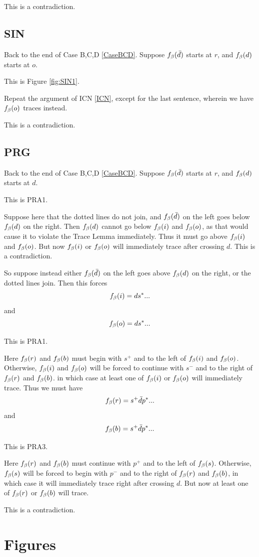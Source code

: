 This is a contradiction.

\subsection{SIN} \label{SIN}
Back to the end of Case B,C,D \ref{CaseBCD}. Suppose $f_\beta(\bar{d})$ starts at $r$, and $f_\beta(d)$ starts at $o$.

This is Figure \ref{fig:SIN1}.

Repeat the argument of ICN \ref{ICN}, except for the last sentence, wherein we have $f_\beta(o)$ traces instead.

This is a contradiction.

\subsection{PRG}
Back to the end of Case B,C,D \ref{CaseBCD}. Suppose $f_\beta(\bar{d})$ starts at $r$, and $f_\beta(d)$ starts at $d$.

This is PRA1.

Suppose here that the dotted lines do not join, and $f_\beta(\bar{d})$ on the left goes below $f_\beta(d)$ on the right. Then $f_\beta(d)$ cannot go below $f_\beta(i)$ and $f_\beta(o)$, as that would cause it to violate the Trace Lemma immediately. Thus it must go above $f_\beta(i)$ and $f_\beta(o)$. But now $f_\beta(i)$ or $f_\beta(o)$ will immediately trace after crossing $d$. This is a contradiction. 

So suppose instead either $f_\beta(\bar{d})$ on the left goes above $f_\beta(d)$ on the right, or the dotted lines join. Then this forces 
\[
f_\beta(i) = d s^*...
\]
and
\[
f_\beta(o) = d s^*...
\]

This is PRA1.

Here $f_\beta(r)$ and $f_\beta(b)$ must begin with $s^+$ and to the left of $f_\beta(i)$ and $f_\beta(o)$. Otherwise, $f_\beta(i)$ and $f_\beta(o)$ will be forced to continue with $s^-$ and to the right of $f_\beta(r)$ and $f_\beta(b)$. in which case at least one of $f_\beta(i)$ or $f_\beta(o)$ will immediately trace. Thus we must have
\[
f_\beta(r) = s^+ \bar{d} p^*...
\]
and
\[
f_\beta(b) = s^+ \bar{d} p^*...
\]

This is PRA3.

Here $f_\beta(r)$ and $f_\beta(b)$ must continue with $p^+$ and to the left of $f_\beta(s)$. Otherwise, $f_\beta(s)$ will be forced to begin with $p^-$ and to the right of $f_\beta(r)$ and $f_\beta(b)$, in which case it will immediately trace right after crossing $d$. But now at least one of $f_\beta(r)$ or $f_\beta(b)$ will trace. 

This is a contradiction.


\clearpage
\section{Figures}

